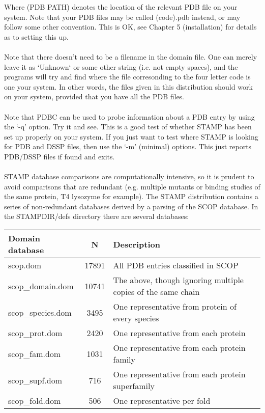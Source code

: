 Where (PDB PATH) denotes the location of the relevant PDB file on your 
system.   Note that your PDB files may be called (code).pdb instead, or
may follow some other convention.  This is OK, see Chapter 5 (installation) for
details as to setting this up.\\
\\
Note that there doesn't need to be a filename in the domain file.  One 
can merely leave it as `Unknown` or some other string (i.e. not empty 
spaces), and the programs will try and find where the file corresonding 
to the four letter code is one your system.  In other words, the files 
given in this distribution should work on your system, provided that
you have all the PDB files.\\
\\
Note that PDBC can be used to probe information about a PDB entry by
using the `-q' option.  Try it and see.   This is a good test of whether 
STAMP has been set up properly on your system.  If you just want to test
where STAMP is looking for PDB and DSSP files, then use the `-m' (minimal)
options.  This just reports PDB/DSSP files if found and exits.\\
\\
STAMP database comparisons are computationally intensive, so it is prudent
to avoid comparisons that are redundant (e.g. multiple mutants or binding studies
of the same protein, T4 lysozyme for example).  The STAMP distribution
contains a series of non-redundant databases derived by a parsing of the
SCOP database.  In the STAMPDIR/defs directory there are several databases:

\begin{tabular}{lcl}
Domain database         & N & Description\\
\hline
scop.dom		& 17891 & All PDB entries classified in SCOP\\
scop\_domain.dom 	& 10741 & The above, though ignoring multiple copies of the same chain\\
scop\_species.dom	& 3495  & One representative from protein of every species\\
scop\_prot.dom		& 2420  & One representative from each protein \\
scop\_fam.dom		& 1031  & One representative from each protein family\\
scop\_supf.dom		&  716  & One representative from each protein superfamily\\
scop\_fold.dom		&  506  & One representative per fold\\
\end{tabular}

